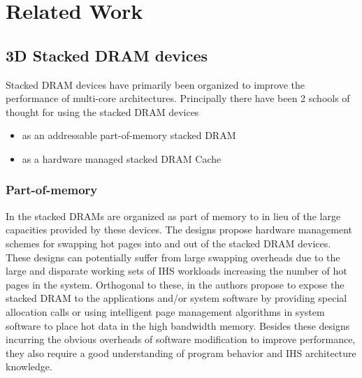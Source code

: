 \chapter{Related Work} \label{chap:related-work}
\section{3D Stacked DRAM devices}
Stacked DRAM devices have primarily been organized to improve the performance of multi-core architectures. Principally there have been 2 schools of thought for using the stacked DRAM devices 
\begin{itemize}
	\item as an addressable part-of-memory stacked DRAM 
	\item as a hardware managed stacked DRAM Cache
\end{itemize}
\subsection{Part-of-memory}
In \cite{pom,cameo} the stacked DRAMs are organized as part of memory to in lieu of the large capacities provided by these devices. The designs propose hardware management schemes for swapping hot pages into and out of the stacked DRAM devices. These designs can potentially suffer from large swapping overheads due to the large and disparate working sets of IHS workloads increasing the number of hot pages in the system. Orthogonal to these, in \cite{software-dram} the authors propose to expose the stacked DRAM to the applications and/or system software by providing special allocation calls or using intelligent page management algorithms in system software to place hot data in the high bandwidth memory. Besides these designs incurring the obvious overheads of software modification to improve performance, they also require a good understanding of program behavior and IHS architecture knowledge.
